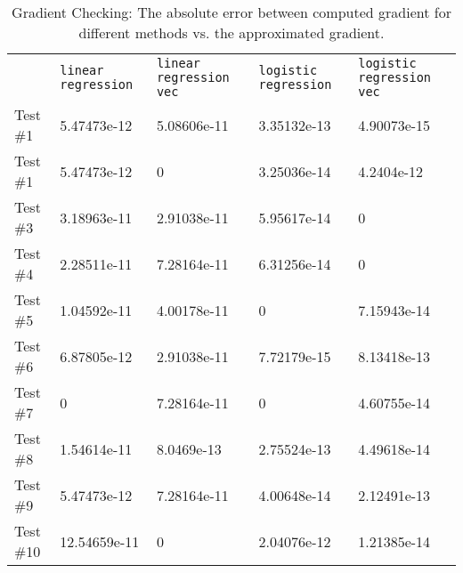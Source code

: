\documentclass[12pt] {article}
\begin{document}
\begin{table}[H]
 \centering    
\begin{tabular}{ |p{1.4cm}|| p{3cm}|p{3cm}|p{3cm}|p{3cm}|}
 \hline
 &  \texttt{linear regression} & \texttt{linear regression vec}  & \texttt{logistic regression} & \texttt{logistic regression vec}\\
  \hhline{|=|=|=|=|=|}
 \hline 
 Test$\#$1  & 5.47473e-12 & 5.08606e-11  & 3.35132e-13 & 4.90073e-15   \\
 Test$\#$1  & 5.47473e-12 &           0  & 3.25036e-14 &  4.2404e-12   \\
 Test$\#$3  & 3.18963e-11 & 2.91038e-11  & 5.95617e-14 &           0   \\
 Test$\#$4  & 2.28511e-11 & 7.28164e-11  & 6.31256e-14 &           0   \\
 Test$\#$5  & 1.04592e-11 & 4.00178e-11  &           0 & 7.15943e-14   \\
 Test$\#$6  & 6.87805e-12 & 2.91038e-11  & 7.72179e-15 & 8.13418e-13   \\
 Test$\#$7  &           0 & 7.28164e-11  &           0 & 4.60755e-14   \\
 Test$\#$8  & 1.54614e-11 &  8.0469e-13  & 2.75524e-13 & 4.49618e-14   \\
 Test$\#$9  & 5.47473e-12 & 7.28164e-11  & 4.00648e-14 & 2.12491e-13   \\
 Test$\#$10 &12.54659e-11 &           0  & 2.04076e-12 & 1.21385e-14   \\
\hline
\end{tabular} 
\caption{Gradient Checking: The absolute error between computed gradient for different methods vs. the approximated gradient.}
   \label{tab:gtest}
\end{table}
\end{document}

